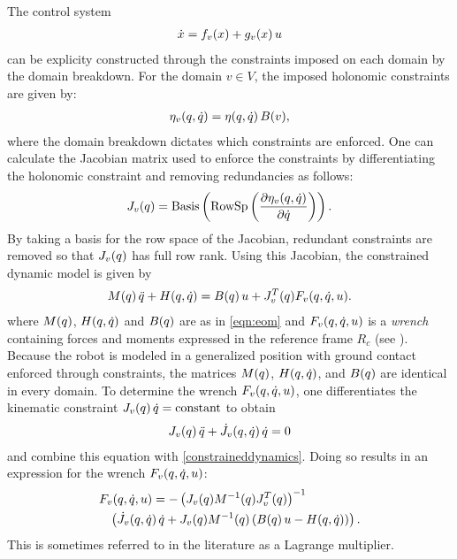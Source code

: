 The control system
\begin{align*}
  {\dot {x}} = f_v(x) + g_v(x) \, u
\end{align*}
can be explicity constructed through the constraints imposed on each domain by
the domain breakdown.
%
For the domain $v \in V$, the imposed holonomic constraints are given by:
%
\begin{align}
  \eta_{v}(q, \dot{q}) = \eta(q, \dot{q}) \, B(v),
\end{align}
%
where the domain breakdown dictates which constraints are enforced.
%
One can calculate the Jacobian matrix used to enforce the constraints by differentiating the holonomic constraint and removing redundancies as follows:
%
\begin{align}
  J_{v}(q) = \mathrm{Basis}\left( \mathrm{RowSp}\left( \frac{\partial{\eta_{v}(q, \dot{q})}}{\partial{{\dot{q}}}} \right) \right).
\end{align}
%
By taking a basis for the row space of the Jacobian, redundant constraints are removed so that $J_v(q)$ has full row rank.
%
Using this Jacobian, the constrained dynamic model is given by
%
\begin{align}
  \label{constraineddynamics}
  M(q) \, \ddot{q} + H(q, \dot{q}) = B(q) \, u + J_v^T(q) F_v(q, \dot{q}, u).
\end{align}
%
where $M(q)$, $H(q, \dot{q})$ and $B(q)$ are as in \eqref{eqn:eom} and $F_v(q, \dot{q}, u)$ is a {\em wrench} containing forces and moments expressed in the reference frame $R_c$ (see \cite{Murray1994}).
%
Because the robot is modeled in a generalized position with ground contact enforced through constraints, the matrices $M(q)$, $H(q, \dot{q})$, and $B(q)$ are identical in every domain.
%
To determine the wrench $F_v(q, \dot{q}, u)$, one differentiates the kinematic constraint $J_v(q) \, \dot{q} = \mathrm{constant}$ to obtain
%
\begin{align}
  J_{v}(q) \, \ddot{q} + {\dot J}_{v}(q, \dot{q}) \, \dot{q} = 0
\end{align}
%
and combine this equation with \eqref{constraineddynamics}.
%
Doing so results in an expression for the wrench $F_v(q, \dot{q}, u)$:
%
\begin{align}
  \label{eq:wrench}
  \lefteqn{F_{v}\argsqdqu = -\left( J_{v}\argsq \M^{-1}\argsq J_{v}^{T}\argsq \right)^{-1} }\\
  \nonumber
  &&\left( {\dot J}_{v}\argsqdq \, \dq + J_{v}\argsq \M^{-1}\argsq \left( \B\argsq \, \uu - \HCor\argsqdq \right) \right).
\end{align}
%
This is sometimes referred to in the literature as a Lagrange multiplier.
